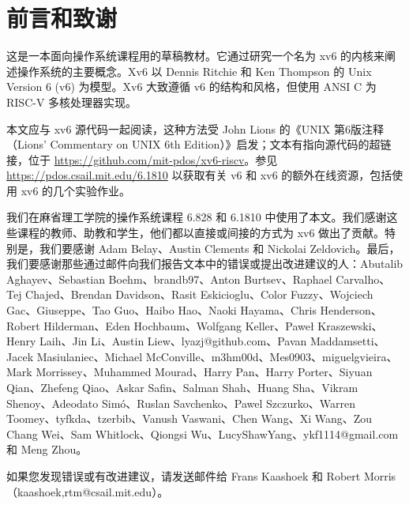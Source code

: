 \chapter*{前言和致谢}


这是一本面向操作系统课程用的草稿教材。它通过研究一个名为 xv6 的内核来阐述操作系统的主要概念。Xv6 以 Dennis Ritchie 和 Ken Thompson 的 Unix Version 6 (v6) 为模型。Xv6 大致遵循 v6 的结构和风格，但使用 ANSI C 为 RISC-V 多核处理器实现。

本文应与 xv6 源代码一起阅读，这种方法受 John Lions 的《UNIX 第6版注释（Lions' Commentary on UNIX 6th Edition）》启发；文本有指向源代码的超链接，位于 \url{https://github.com/mit-pdos/xv6-riscv}。参见 \url{https://pdos.csail.mit.edu/6.1810} 以获取有关 v6 和 xv6 的额外在线资源，包括使用 xv6 的几个实验作业。

我们在麻省理工学院的操作系统课程 6.828 和 6.1810 中使用了本文。我们感谢这些课程的教师、助教和学生，他们都以直接或间接的方式为 xv6 做出了贡献。特别是，我们要感谢 Adam Belay、Austin Clements 和 Nickolai Zeldovich。最后，我们要感谢那些通过邮件向我们报告文本中的错误或提出改进建议的人：Abutalib Aghayev、Sebastian Boehm、brandb97、Anton Burtsev、Raphael Carvalho、Tej Chajed、Brendan Davidson、Rasit Eskicioglu、Color Fuzzy、Wojciech Gac、Giuseppe、Tao Guo、Haibo Hao、Naoki Hayama、Chris Henderson、Robert Hilderman、Eden Hochbaum、Wolfgang Keller、Paweł Kraszewski、Henry Laih、Jin Li、Austin Liew、lyazj@github.com、Pavan Maddamsetti、Jacek Masiulaniec、Michael McConville、m3hm00d、Mes0903、miguelgvieira、Mark Morrissey、Muhammed Mourad、Harry Pan、Harry Porter、Siyuan Qian、Zhefeng Qiao、Askar Safin、Salman Shah、Huang Sha、Vikram Shenoy、Adeodato Simó、Ruslan Savchenko、Pawel Szczurko、Warren Toomey、tyfkda、tzerbib、Vanush Vaswani、Chen Wang、Xi Wang、Zou Chang Wei、Sam Whitlock、Qiongsi Wu、LucyShawYang、ykf1114@gmail.com 和 Meng Zhou。

如果您发现错误或有改进建议，请发送邮件给 Frans Kaashoek 和 Robert Morris（kaashoek,rtm@csail.mit.edu）。
